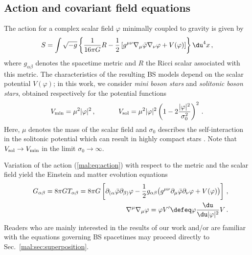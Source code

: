 \subsection{Action and covariant field equations}
%
The action for a complex scalar field $\varphi$ minimally coupled to gravity is given by
%
\begin{equation}
S = \int\sqrt{-g}\left\{
  \frac{1}{16\pi G}R - \frac{1}{2}\left[ 
  g^{\mu \nu}\nabla_{\mu}\bar{\varphi}\nabla_{\nu}\varphi
  + V(\varphi)\right] \right\} \du^4 x\,,
  \label{mal:eq:action}
\end{equation}
%
where $g_{\alpha\beta}$ denotes the spacetime metric and $R$ the
Ricci scalar associated with this metric. The characteristics
of the resulting BS models depend on the scalar potential
$V(\varphi)$; in this work, we consider {\it mini boson stars}
and {\it solitonic boson stars}, obtained respectively
for the potential functions
%
\begin{equation}
  V_{\rm min} = \mu^2 |\varphi|^2\,,~~~~~~~~~~
  V_{\rm sol} = \mu^2 |\varphi|^2\left(1-2\frac{|\varphi|^2}{\sigma_0^2}
  \right)^2\,.
  \label{mal:eq:pot}
\end{equation}
%
Here, $\mu$ denotes the mass of the scalar field and $\sigma_0$
describes the self-interaction in the solitonic potential
which can result in highly compact stars
\cite{Lee:1986ts}. Note that $V_{\rm sol}\rightarrow 
V_{\rm min}$ in the limit $\sigma_0\rightarrow \infty$.

Variation of the action (\ref{mal:eq:action}) with respect to the
metric and the scalar field yield the Einstein and matter
evolution equations
%
\begin{eqnarray}
  &&G_{\alpha\beta} = 8\pi G T_{\alpha\beta}
  = 8\pi G\left[
  \partial_{(\alpha}\bar{\varphi}\partial_{\beta)}\varphi
  -\frac{1}{2}g_{\alpha\beta}
  \big(
  g^{\mu\nu}\partial_{\mu}
  \bar{\varphi}\partial_{\nu}\varphi+ V(\varphi)
  \big)
  \right]\,, \label{mal:eq:Einstein} \\
  &&\nabla^{\mu}\nabla_{\mu}\varphi = \varphi V'
  \defeq \varphi \frac{\du}{\du |\varphi|^2}
  V\,.
  \label{mal:eq:Boxvarphi}
\end{eqnarray}
%
Readers who are mainly interested in the results of our work
and/or are familiar with the equations governing BS spacetimes
may proceed directly to Sec.~\ref{mal:sec:superposition}.

